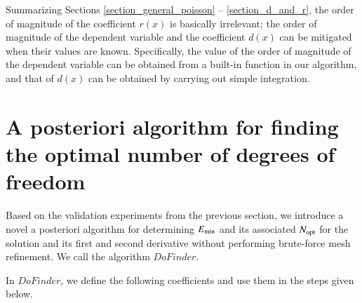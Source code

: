 \documentclass[review,3p]{elsarticle}
\begin{document}
Summarizing Sections \ref{section_general_poisson} -- \ref{section_d_and_r}, the order of magnitude of the coefficient $r(x)$ is basically irrelevant; the order of magnitude of the dependent variable and the coefficient $d(x)$ can be mitigated when their values are known. Specifically, the value of the order of magnitude of the dependent variable can be obtained from a built-in function in our algorithm, and that of $d(x)$ can be obtained by carrying out simple integration.

\section{A posteriori algorithm for finding the optimal number of degrees of freedom}		\label{section_algorithm}

Based on the validation experiments from the previous section, we introduce a novel a posteriori algorithm for determining $E_{\rm min}$ and its associated $N_{\rm opt}$ for the solution and its first and second derivative without performing brute-force mesh refinement. We call the algorithm $DoFinder$.

In $DoFinder$, we define the following coefficients and use them in the steps given below.
\end{document}

